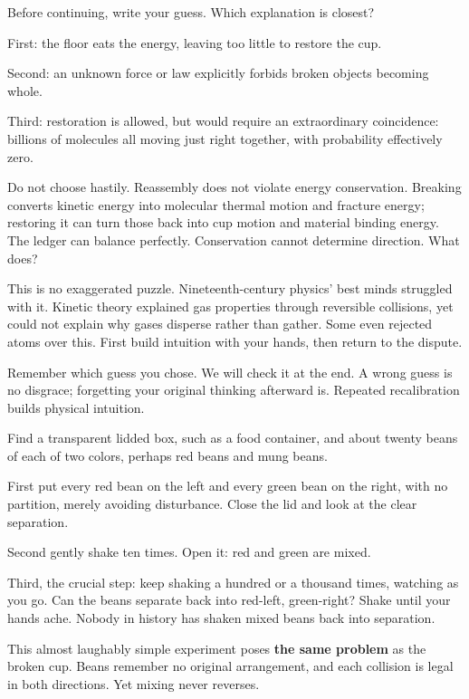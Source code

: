 
Before continuing, write your guess. Which explanation is closest?

First: the floor eats the energy, leaving too little to restore the cup.

Second: an unknown force or law explicitly forbids broken objects becoming whole.

Third: restoration is allowed, but would require an extraordinary coincidence: billions of molecules all moving just right together, with probability effectively zero.

Do not choose hastily. Reassembly does not violate energy conservation. Breaking converts kinetic energy into molecular thermal motion and fracture energy; restoring it can turn those back into cup motion and material binding energy. The ledger can balance perfectly. Conservation cannot determine direction. What does?

This is no exaggerated puzzle. Nineteenth-century physics' best minds struggled with it. Kinetic theory explained gas properties through reversible collisions, yet could not explain why gases disperse rather than gather. Some even rejected atoms over this. First build intuition with your hands, then return to the dispute.

Remember which guess you chose. We will check it at the end. A wrong guess is no disgrace; forgetting your original thinking afterward is. Repeated recalibration builds physical intuition.


\begin{experiment}
Find a transparent lidded box, such as a food container, and about twenty beans of each of two colors, perhaps red beans and mung beans.

First put every red bean on the left and every green bean on the right, with no partition, merely avoiding disturbance. Close the lid and look at the clear separation.

Second gently shake ten times. Open it: red and green are mixed.

Third, the crucial step: keep shaking a hundred or a thousand times, watching as you go. Can the beans separate back into red-left, green-right? Shake until your hands ache. Nobody in history has shaken mixed beans back into separation.
\end{experiment}

This almost laughably simple experiment poses \textbf{the same problem} as the broken cup. Beans remember no original arrangement, and each collision is legal in both directions. Yet mixing never reverses.

